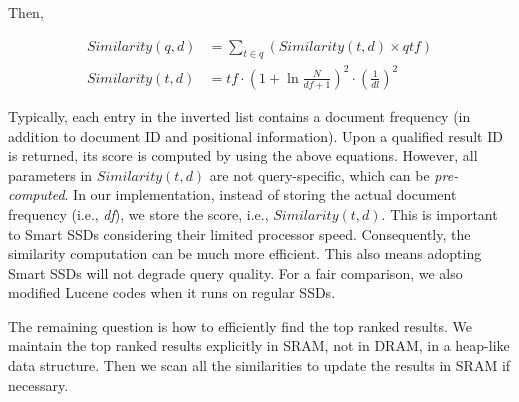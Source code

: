 \noindent Then,

\begin{displaymath}
  \begin{aligned}
    Similarity(q,d)&=\sum_{t\in q}(Similarity(t,d) \times qtf)\\
    Similarity(t,d)&=tf\cdot(1+\ln\frac{N}{df + 1})^2\cdot(\frac{1}{dl})^2
  \end{aligned}
\end{displaymath}


Typically, each entry in the inverted list contains a document frequency (in addition to document ID and positional information).
Upon a qualified result ID is returned, its score is computed by using the above equations. However, all parameters in $Similarity(t,d)$ are not query-specific, which can be \emph{pre-computed}. In our implementation, instead of storing the actual document frequency (i.e., \emph{df}), we store the score, i.e., $Similarity(t,d)$. This is important to Smart SSDs considering their limited processor speed. Consequently, the similarity computation can be much more efficient. This also means adopting Smart SSDs will not degrade query quality. For a fair comparison, we also modified Lucene codes when it runs on regular SSDs.

The remaining question is how to efficiently find the top ranked results. We maintain the top ranked results explicitly in SRAM, not in DRAM, in a heap-like data structure. Then we scan all the similarities to update the results in SRAM if necessary. 